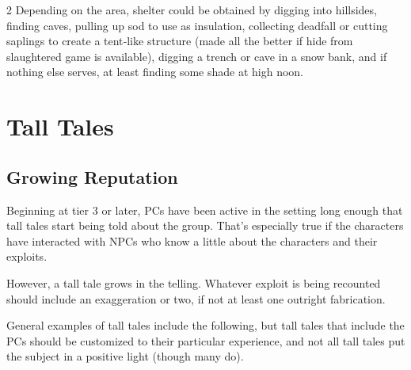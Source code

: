 \begin{multicols}{2}
Depending on the area, shelter could be obtained by digging into hillsides, finding caves, pulling up sod to use as insulation, collecting deadfall or cutting saplings to create a tent‑like structure (made all the better if hide from slaughtered game is available), digging a trench or cave in a snow bank, and if nothing else serves, at least finding some shade at high noon.

\chapter{Tall Tales}

\section{Growing Reputation} 

Beginning at tier 3 or later, PCs have been active in the setting long enough that tall tales start being told about the group. That’s especially true if the characters have interacted with NPCs who know a little about the characters and their exploits. 

However, a tall tale grows in the telling. Whatever exploit is being recounted should include an exaggeration or two, if not at least one outright fabrication. 

General examples of tall tales include the following, but tall tales that include the PCs should be customized to their particular experience, and not all tall tales put the subject in a positive light (though many do).

\end{multicols}


